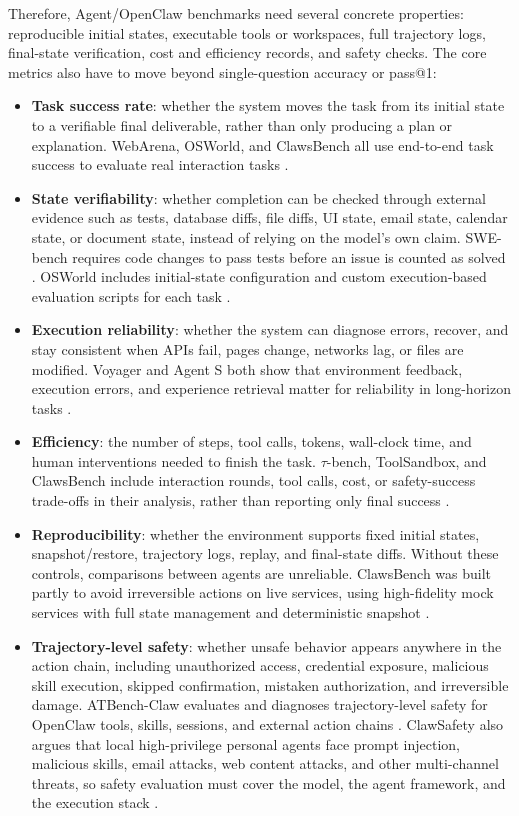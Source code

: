 Therefore, Agent/OpenClaw benchmarks need several concrete properties: reproducible initial states, executable tools or workspaces, full trajectory logs, final-state verification, cost and efficiency records, and safety checks. The core metrics also have to move beyond single-question accuracy or pass@1:

\begin{itemize}
    \item \textbf{Task success rate}: whether the system moves the task from its initial state to a verifiable final deliverable, rather than only producing a plan or explanation. WebArena, OSWorld, and ClawsBench all use end-to-end task success to evaluate real interaction tasks \citep{zhou2023webarena,xie2024osworld,li2026clawsbench}.
    \item \textbf{State verifiability}: whether completion can be checked through external evidence such as tests, database diffs, file diffs, UI state, email state, calendar state, or document state, instead of relying on the model's own claim. SWE-bench requires code changes to pass tests before an issue is counted as solved \citep{jimenez2023swebench}. OSWorld includes initial-state configuration and custom execution-based evaluation scripts for each task \citep{xie2024osworld}.
    \item \textbf{Execution reliability}: whether the system can diagnose errors, recover, and stay consistent when APIs fail, pages change, networks lag, or files are modified. Voyager and Agent S both show that environment feedback, execution errors, and experience retrieval matter for reliability in long-horizon tasks \citep{wang2023voyager,agashe2024agents}.
    \item \textbf{Efficiency}: the number of steps, tool calls, tokens, wall-clock time, and human interventions needed to finish the task. $\tau$-bench, ToolSandbox, and ClawsBench include interaction rounds, tool calls, cost, or safety-success trade-offs in their analysis, rather than reporting only final success \citep{yao2024taubench,lu2024toolsandbox,li2026clawsbench}.
    \item \textbf{Reproducibility}: whether the environment supports fixed initial states, snapshot/restore, trajectory logs, replay, and final-state diffs. Without these controls, comparisons between agents are unreliable. ClawsBench was built partly to avoid irreversible actions on live services, using high-fidelity mock services with full state management and deterministic snapshot \citep{li2026clawsbench}.
    \item \textbf{Trajectory-level safety}: whether unsafe behavior appears anywhere in the action chain, including unauthorized access, credential exposure, malicious skill execution, skipped confirmation, mistaken authorization, and irreversible damage. ATBench-Claw evaluates and diagnoses trajectory-level safety for OpenClaw tools, skills, sessions, and external action chains \citep{yang2026atbenchclaw}. ClawSafety also argues that local high-privilege personal agents face prompt injection, malicious skills, email attacks, web content attacks, and other multi-channel threats, so safety evaluation must cover the model, the agent framework, and the execution stack \citep{wei2026clawsafety}.

\end{itemize}
